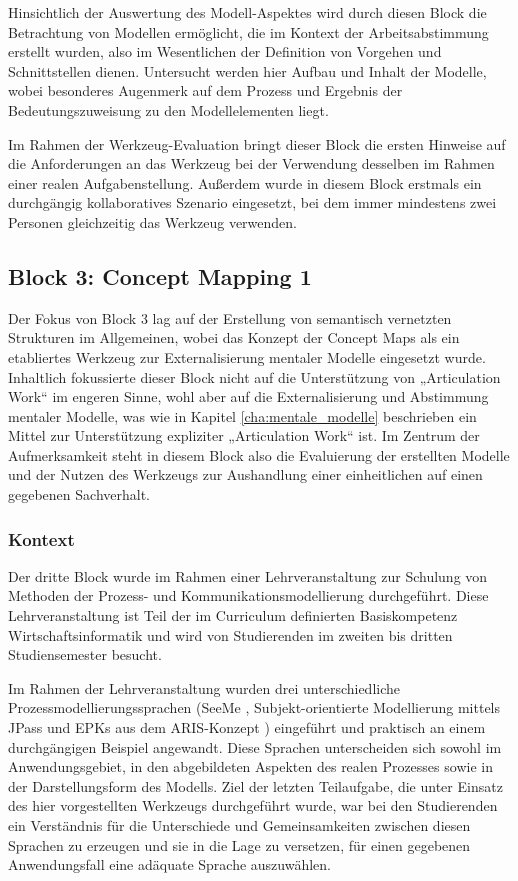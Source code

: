 Hinsichtlich der Auswertung des Modell-Aspektes wird durch diesen Block die Betrachtung von Modellen ermöglicht, die im Kontext der Arbeitsabstimmung erstellt wurden, also im Wesentlichen der Definition von Vorgehen und Schnittstellen dienen. Untersucht werden hier Aufbau und Inhalt der Modelle, wobei besonderes Augenmerk auf dem Prozess und Ergebnis der Bedeutungszuweisung zu den Modellelementen liegt.

Im Rahmen der Werkzeug-Evaluation bringt dieser Block die ersten Hinweise auf die Anforderungen an das Werkzeug bei der Verwendung desselben im Rahmen einer realen Aufgabenstellung. Außerdem wurde in diesem Block erstmals ein durchgängig kollaboratives Szenario eingesetzt, bei dem immer mindestens zwei Personen gleichzeitig das Werkzeug verwenden.


\subsection{Block 3: Concept Mapping 1}
\label{sub:eval_3}

Der Fokus von Block 3 lag auf der Erstellung von semantisch vernetzten Strukturen im Allgemeinen, wobei das Konzept der Concept Maps als ein etabliertes Werkzeug zur Externalisierung mentaler Modelle eingesetzt wurde. Inhaltlich fokussierte dieser Block nicht auf die Unterstützung von „Articulation Work“ im engeren Sinne, wohl aber auf die Externalisierung und Abstimmung mentaler Modelle, was wie in Kapitel \ref{cha:mentale_modelle} beschrieben ein Mittel zur Unterstützung expliziter „Articulation Work“ ist. Im Zentrum der Aufmerksamkeit steht in diesem Block also die Evaluierung der erstellten Modelle und der Nutzen des Werkzeugs zur Aushandlung einer einheitlichen auf einen gegebenen Sachverhalt.

\subsubsection{Kontext} %
\label{ssub:3_kontext}

Der dritte Block wurde im Rahmen einer Lehrveranstaltung zur Schulung von Methoden der Prozess- und Kommunikationsmodellierung durchgeführt. Diese Lehrveranstaltung ist Teil der im Curriculum definierten Basiskompetenz Wirtschaftsinformatik und wird von Studierenden im zweiten bis dritten Studiensemester besucht.

Im Rahmen der Lehrveranstaltung wurden drei unterschiedliche Prozessmodellierungssprachen (SeeMe \citep{Herrmann04a}, Subjekt-orientierte Modellierung mittels JPass \citep{Fleischmann07} und \gls{EPK}s aus dem ARIS-Konzept \citep{Scheer00}) eingeführt und praktisch an einem durchgängigen Beispiel angewandt. Diese Sprachen unterscheiden sich sowohl im Anwendungsgebiet, in den abgebildeten Aspekten des realen Prozesses sowie in der Darstellungsform des Modells. Ziel der letzten Teilaufgabe, die unter Einsatz des hier vorgestellten Werkzeugs durchgeführt wurde, war bei den Studierenden ein Verständnis für die Unterschiede und Gemeinsamkeiten zwischen diesen Sprachen zu erzeugen und sie in die Lage zu versetzen, für einen gegebenen Anwendungsfall eine adäquate Sprache auszuwählen.  

